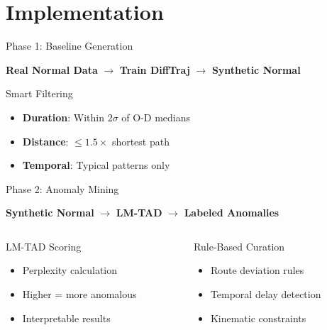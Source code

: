 \documentclass[aspectratio=169,xcolor={dvipsnames}]{beamer}
\begin{document}
\section{Implementation}

\begin{frame}{Phase 1: Baseline Generation}
  \begin{block}{}
    \centering
    \Large \textbf{Real Normal Data} $\rightarrow$ \textbf{Train DiffTraj} $\rightarrow$ \textbf{Synthetic Normal}
  \end{block}
  
  \vspace{1em}
  \begin{block}{Smart Filtering}
    \begin{itemize}
      \item \textbf{Duration}: Within $2\sigma$ of O-D medians
      \item \textbf{Distance}: $\leq 1.5 \times$ shortest path
      \item \textbf{Temporal}: Typical patterns only
    \end{itemize}
  \end{block}
\end{frame}

\begin{frame}{Phase 2: Anomaly Mining}
  \begin{block}{}
    \centering
    \Large \textbf{Synthetic Normal} $\rightarrow$ \textbf{LM-TAD} $\rightarrow$ \textbf{Labeled Anomalies}
  \end{block}
  
  \vspace{1em}
  \begin{columns}[T,onlytextwidth]
    \begin{column}{0.48\textwidth}
      \begin{block}{LM-TAD Scoring}
        \begin{itemize}
          \item Perplexity calculation
          \item Higher = more anomalous
          \item Interpretable results
        \end{itemize}
      \end{block}
    \end{column}
    \hspace{0.04\textwidth}
    \begin{column}{0.48\textwidth}
      \begin{block}{Rule-Based Curation}
        \begin{itemize}
          \item Route deviation rules
          \item Temporal delay detection
          \item Kinematic constraints
        \end{itemize}
      \end{block}
    \end{column}
  \end{columns}
\end{frame}
\end{document}
